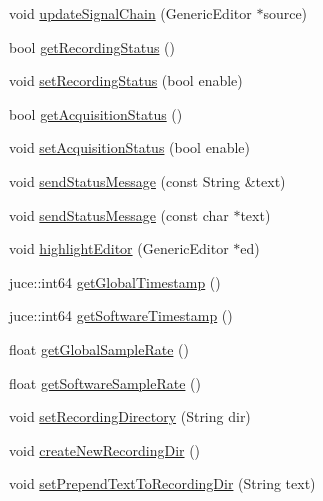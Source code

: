 \begin{DoxyCompactItemize}
\item 
void \mbox{\hyperlink{namespace_core_services_a2e53c32783c6caa3d66afb7172dc61fd}{update\+Signal\+Chain}} (Generic\+Editor $\ast$source)
\item 
bool \mbox{\hyperlink{namespace_core_services_a877cdc8ef0b6ea0dce61575de663c6f3}{get\+Recording\+Status}} ()
\item 
void \mbox{\hyperlink{namespace_core_services_a70b56adbc7be044f913f088a162a69fd}{set\+Recording\+Status}} (bool enable)
\item 
bool \mbox{\hyperlink{namespace_core_services_afe3e006d8ad41f122bd0d68b9d5976b0}{get\+Acquisition\+Status}} ()
\item 
void \mbox{\hyperlink{namespace_core_services_a93b4f6a705bead14ce6caa04355b03ba}{set\+Acquisition\+Status}} (bool enable)
\item 
void \mbox{\hyperlink{namespace_core_services_a78fdbd1d2b88cc908e60559b47d8a77e}{send\+Status\+Message}} (const String \&text)
\item 
void \mbox{\hyperlink{namespace_core_services_aafd9eeb68c631f37fa234eee4eb8fbca}{send\+Status\+Message}} (const char $\ast$text)
\item 
void \mbox{\hyperlink{namespace_core_services_a3b017a18a0a09b6c4e2fa4af4c5df11e}{highlight\+Editor}} (Generic\+Editor $\ast$ed)
\item 
juce\+::int64 \mbox{\hyperlink{namespace_core_services_a79defb96087c3bddcb388a29a38d6952}{get\+Global\+Timestamp}} ()
\item 
juce\+::int64 \mbox{\hyperlink{namespace_core_services_ad1083e5525ad9ebd19afd9364f122059}{get\+Software\+Timestamp}} ()
\item 
float \mbox{\hyperlink{namespace_core_services_ac9fb78e241aa3805b05d206c78ecfca1}{get\+Global\+Sample\+Rate}} ()
\item 
float \mbox{\hyperlink{namespace_core_services_a1ce836de202979c7c8a8e4f4d42c87f4}{get\+Software\+Sample\+Rate}} ()
\item 
void \mbox{\hyperlink{namespace_core_services_a5b804cf3cba68340baeb3b7c7173b530}{set\+Recording\+Directory}} (String dir)
\item 
void \mbox{\hyperlink{namespace_core_services_a450d2d9574435570b5e4e38caaeb05d7}{create\+New\+Recording\+Dir}} ()
\item 
void \mbox{\hyperlink{namespace_core_services_a2ea8b92387e1ae7ce51180a3861e528c}{set\+Prepend\+Text\+To\+Recording\+Dir}} (String text)
\item 

\end{DoxyCompactItemize}
